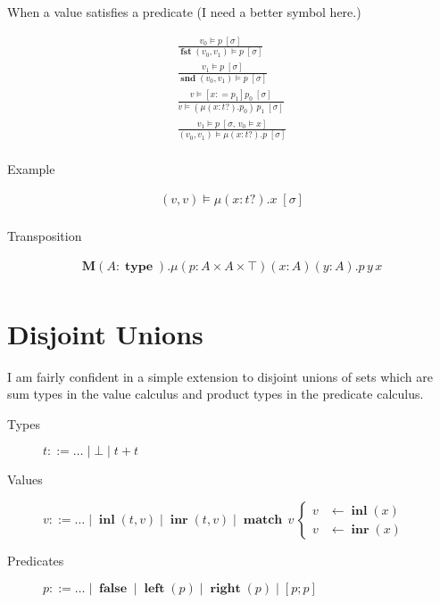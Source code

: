 \documentclass[twocolumn, fleqn]{scrartcl}
\newcommand{\bnfdef}{\mathbin{::=}}
\DeclareMathOperator{\fst}{\textbf{fst}}
\DeclareMathOperator{\snd}{\textbf{snd}}
\DeclareMathOperator{\inl}{\textbf{inl}}
\DeclareMathOperator{\inr}{\textbf{inr}}
\DeclareMathOperator{\false}{\textbf{false}}
\DeclareMathOperator{\lft}{\textbf{left}}
\DeclareMathOperator{\rgt}{\textbf{right}}
\DeclareMathOperator{\type}{\textbf{type}}
\DeclareMathOperator{\case}{\textbf{match}}
\begin{document}
When a value satisfies a predicate (I need a better symbol here.)

\begin{multline*}
\frac{
  v_0 \models p \; [\sigma]
}{
  \fst ( v_0 , v_1 ) \models p \; [\sigma]
}\\
\frac{
  v_1 \models p \; [\sigma]
}{
  \snd ( v_0 , v_1 ) \models p \; [\sigma]
}\\
\frac{
  v \models [x \colon= p_1] p_0 \; [\sigma]
}{
  v \models ( \mu (x \colon t ?). p_0) \, p_1 \; [\sigma]
}\\
\frac{
  v_1 \models p \; [ \sigma , \, v_0 \models x]
}{
  ( v_0 , v_1 ) \models \mu (x \colon t ?). p \; [\sigma]
}\\
\end{multline*}

Example

\begin{multline*}
   ( v , v ) \models \mu (x \colon t ?). x \; [\sigma]\\
\end{multline*}

Transposition

\begin{multline*}
   \textbf{M} (A \colon \type). \mu (p \colon A \times A \times \top) (x \colon A) (y \colon A). p \, y \, x\\
\end{multline*}

\section*{Disjoint Unions}

I am fairly confident in a simple extension to disjoint unions
of sets which are sum types in the value calculus and product types in
the predicate calculus.

\begin{description}
\item[Types] \( t \bnfdef \ldots \mid \bot \mid t + t \)
\item[Values] \( v \bnfdef \ldots \mid \inl(t, v) \mid \inr(t, v) \mid
  \case \, v \,
  \begin{cases}
    v & \leftarrow \inl(x) \\
    v & \leftarrow \inr(x)
  \end{cases}
  \)
\item[Predicates] \( p \bnfdef \ldots \mid \false \mid \lft(p) \mid \rgt(p) \mid [ p ; p ] \)
\end{description}
\end{document}
